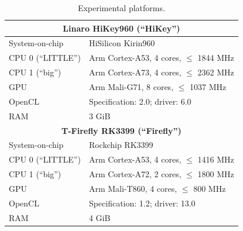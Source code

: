 \documentclass[sigplan]{acmart}
\begin{document}
\begin{table}
\centering
  \begin{tabular}{ll}
  \toprule
  \multicolumn{2}{c}{{\bf Linaro HiKey960 (``HiKey'')}}\\
  \midrule
  System-on-chip      & HiSilicon Kirin960                      \\
  CPU 0 (``LITTLE'')  & Arm Cortex-A53, 4 cores, $\le$ 1844 MHz \\
  CPU 1 (``big'')     & Arm Cortex-A73, 4 cores, $\le$ 2362 MHz \\
  GPU                 & Arm Mali-G71,   8 cores, $\le$ 1037 MHz \\
  OpenCL              & Specification: 2.0; driver: 6.0         \\
  RAM                 & 3 GiB                                   \\
  \midrule
  \multicolumn{2}{c}{{\bf T-Firefly RK3399 (``Firefly'')}}\\
  \midrule
  System-on-chip      & Rockchip RK3399                         \\
  CPU 0 (``LITTLE'')  & Arm Cortex-A53, 4 cores, $\le$ 1416 MHz \\
  CPU 1 (``big'')     & Arm Cortex-A72, 2 cores, $\le$ 1800 MHz \\
  GPU                 & Arm Mali-T860,  4 cores, $\le$  800 MHz \\
  OpenCL              & Specification: 1.2; driver: 13.0        \\
  RAM                 & 4 GiB                                   \\
  \bottomrule
  \end{tabular}
\caption{\label{tab:platforms}Experimental platforms.}
\end{table}
\end{document}
